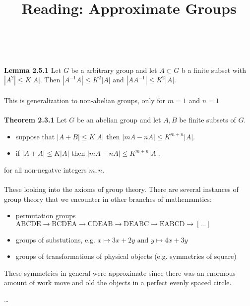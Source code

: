 \documentclass[12pt]{article}
\title{Reading: Approximate Groups}
\date{}
\begin{document}
\sffamily

\maketitle

{\fontsize{16pt}{16pt}\selectfont 

\noindent   \\ \\
 \textbf{Lemma 2.5.1} Let $G$ be a {\color{red!75!black}arbitrary} group and let $A \subset G$ b a finite subset with $|A^2| \leq K | A|$.  Then $|A^{-1}A|\leq K^2 |A|$ and $|A A^{-1}| \leq K^2|A|$. \\ \\
This is generalization to non-abelian groups, only for $m=1$ and $n=1$ \\ \\
\textbf{Theorem 2.3.1}  Let $G$ be an {\color{yellow!50!black}abelian} group and let $A, B$ be finite subsets of $G$.  
\begin{itemize}
	\item suppose that $|A + B| \leq K |A|$ then $|mA - nA| \leq K^{m+n}|A|$.
	\item if $|A+A| \leq K|A|$ then $|mA - nA| \leq K^{m+n}|A|$.
\end{itemize}
for all non-negatve integers $m,n$. \\ \\
These looking into the axioms of group theory.  There are several instances of group theory that we encounter in other branches of mathemamtics:
\begin{itemize}
\item permutation groups \\ $\text{ABCDE} \to \text{BCDEA} \to \text{CDEAB} \to \text{DEABC} \to \text{EABCD} \to [\dots]$
\item groups of substutions, e.g. 
$x \mapsto 3x + 2y \text{ and }y \mapsto 4x + 3y $
\item groups of transformations of physical objects (e.g. symmetries of square)
\end{itemize}
These symmetries in general were approximate since there was an enormous amount of work move and old the objects in a perfect evenly spaced circle.

\vfill

\begin{thebibliography}{}

\item \dots 

\end{thebibliography}
}
\end{document}

